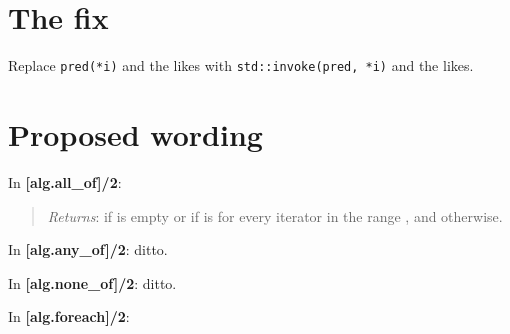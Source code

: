 \documentclass{wg21}
\newcommand{\cc}[1]{\texttt{#1}}
\begin{document}
\section{The fix}

Replace \cc{pred(*i)} and the likes with \cc{std::invoke(pred, *i)}
and the likes.

\section{Proposed wording}

In \textbf{[alg.all_of]/2}:
\begin{quote}
  \emph{Returns}:  if \tcode{[first, last)} is empty or if
    is
   for every iterator  in the range \tcode{[first, last)},
  and  otherwise.
\end{quote}

In \textbf{[alg.any_of]/2}: ditto.

In \textbf{[alg.none_of]/2}: ditto.

In \textbf{[alg.foreach]/2}:
\begin{quote}
\end{quote}
\end{document}
